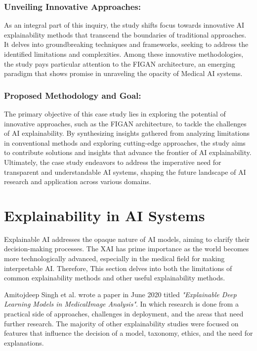 \subsubsection{Unveiling Innovative Approaches:}
As an integral part of this inquiry, the study shifts focus towards innovative AI explainability methods that transcend the boundaries of traditional approaches. It delves into groundbreaking techniques and frameworks, seeking to address the identified limitations and complexities. Among these innovative methodologies, the study pays particular attention to the FIGAN architecture, an emerging paradigm that shows promise in unraveling the opacity of Medical AI systems.

\subsubsection{Proposed Methodology and Goal:}
The primary objective of this case study lies in exploring the potential of innovative approaches, such as the FIGAN architecture, to tackle the challenges of AI explainability. By synthesizing insights gathered from analyzing limitations in conventional methods and exploring cutting-edge approaches, the study aims to contribute solutions and insights that advance the frontier of AI explainability. Ultimately, the case study endeavors to address the imperative need for transparent and understandable AI systems, shaping the future landscape of AI research and application across various domains.

\clearpage

\section{Explainability in AI Systems}

\noindent
Explainable AI addresses the opaque nature of AI models, aiming to clarify their decision-making processes. The XAI has prime importance as the world becomes more technologically advanced, especially in the medical field for making interpretable AI. Therefore, This section delves into both the limitations of common explainability methods and other useful explainability methods.

\noindent
Amitojdeep Singh et al. wrote a paper in June 2020 titled \textit{"Explainable Deep Learning Models in MedicalImage Analysis"}. In which research is done from a practical side of approaches, challenges in deployment, and the areas that need further research. The majority of other explainability studies were focused on features that influence the decision of a model, taxonomy, ethics, and the need for explanations.\cite{XAI_Medical}

